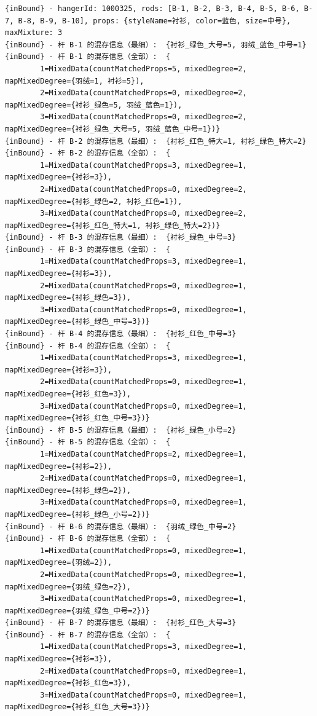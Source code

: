 {\begin{verbatim}
{inBound} - hangerId: 1000325, rods: [B-1, B-2, B-3, B-4, B-5, B-6, B-7, B-8, B-9, B-10], props: {styleName=衬衫, color=蓝色, size=中号}, maxMixture: 3
{inBound} - 杆 B-1 的混存信息（最细）:  {衬衫_绿色_大号=5, 羽绒_蓝色_中号=1}
{inBound} - 杆 B-1 的混存信息（全部）:  {
		1=MixedData(countMatchedProps=5, mixedDegree=2, mapMixedDegree={羽绒=1, 衬衫=5}), 
		2=MixedData(countMatchedProps=0, mixedDegree=2, mapMixedDegree={衬衫_绿色=5, 羽绒_蓝色=1}), 
		3=MixedData(countMatchedProps=0, mixedDegree=2, mapMixedDegree={衬衫_绿色_大号=5, 羽绒_蓝色_中号=1})}
{inBound} - 杆 B-2 的混存信息（最细）:  {衬衫_红色_特大=1, 衬衫_绿色_特大=2}
{inBound} - 杆 B-2 的混存信息（全部）:  {
		1=MixedData(countMatchedProps=3, mixedDegree=1, mapMixedDegree={衬衫=3}), 
		2=MixedData(countMatchedProps=0, mixedDegree=2, mapMixedDegree={衬衫_绿色=2, 衬衫_红色=1}), 
		3=MixedData(countMatchedProps=0, mixedDegree=2, mapMixedDegree={衬衫_红色_特大=1, 衬衫_绿色_特大=2})}
{inBound} - 杆 B-3 的混存信息（最细）:  {衬衫_绿色_中号=3}
{inBound} - 杆 B-3 的混存信息（全部）:  {
		1=MixedData(countMatchedProps=3, mixedDegree=1, mapMixedDegree={衬衫=3}), 
		2=MixedData(countMatchedProps=0, mixedDegree=1, mapMixedDegree={衬衫_绿色=3}), 
		3=MixedData(countMatchedProps=0, mixedDegree=1, mapMixedDegree={衬衫_绿色_中号=3})}
{inBound} - 杆 B-4 的混存信息（最细）:  {衬衫_红色_中号=3}
{inBound} - 杆 B-4 的混存信息（全部）:  {
		1=MixedData(countMatchedProps=3, mixedDegree=1, mapMixedDegree={衬衫=3}), 
		2=MixedData(countMatchedProps=0, mixedDegree=1, mapMixedDegree={衬衫_红色=3}), 
		3=MixedData(countMatchedProps=0, mixedDegree=1, mapMixedDegree={衬衫_红色_中号=3})}
{inBound} - 杆 B-5 的混存信息（最细）:  {衬衫_绿色_小号=2}
{inBound} - 杆 B-5 的混存信息（全部）:  {
		1=MixedData(countMatchedProps=2, mixedDegree=1, mapMixedDegree={衬衫=2}), 
		2=MixedData(countMatchedProps=0, mixedDegree=1, mapMixedDegree={衬衫_绿色=2}), 
		3=MixedData(countMatchedProps=0, mixedDegree=1, mapMixedDegree={衬衫_绿色_小号=2})}
{inBound} - 杆 B-6 的混存信息（最细）:  {羽绒_绿色_中号=2}
{inBound} - 杆 B-6 的混存信息（全部）:  {
		1=MixedData(countMatchedProps=0, mixedDegree=1, mapMixedDegree={羽绒=2}), 
		2=MixedData(countMatchedProps=0, mixedDegree=1, mapMixedDegree={羽绒_绿色=2}), 
		3=MixedData(countMatchedProps=0, mixedDegree=1, mapMixedDegree={羽绒_绿色_中号=2})}
{inBound} - 杆 B-7 的混存信息（最细）:  {衬衫_红色_大号=3}
{inBound} - 杆 B-7 的混存信息（全部）:  {
		1=MixedData(countMatchedProps=3, mixedDegree=1, mapMixedDegree={衬衫=3}), 
		2=MixedData(countMatchedProps=0, mixedDegree=1, mapMixedDegree={衬衫_红色=3}), 
		3=MixedData(countMatchedProps=0, mixedDegree=1, mapMixedDegree={衬衫_红色_大号=3})}

\end{verbatim}}
